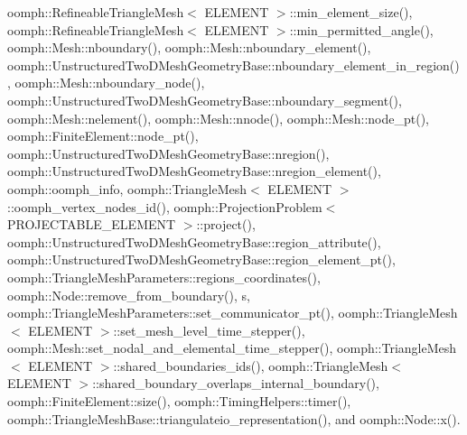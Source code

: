 oomph\+::\+Refineable\+Triangle\+Mesh$<$ E\+L\+E\+M\+E\+N\+T $>$\+::min\+\_\+element\+\_\+size(), oomph\+::\+Refineable\+Triangle\+Mesh$<$ E\+L\+E\+M\+E\+N\+T $>$\+::min\+\_\+permitted\+\_\+angle(), oomph\+::\+Mesh\+::nboundary(), oomph\+::\+Mesh\+::nboundary\+\_\+element(), oomph\+::\+Unstructured\+Two\+D\+Mesh\+Geometry\+Base\+::nboundary\+\_\+element\+\_\+in\+\_\+region(), oomph\+::\+Mesh\+::nboundary\+\_\+node(), oomph\+::\+Unstructured\+Two\+D\+Mesh\+Geometry\+Base\+::nboundary\+\_\+segment(), oomph\+::\+Mesh\+::nelement(), oomph\+::\+Mesh\+::nnode(), oomph\+::\+Mesh\+::node\+\_\+pt(), oomph\+::\+Finite\+Element\+::node\+\_\+pt(), oomph\+::\+Unstructured\+Two\+D\+Mesh\+Geometry\+Base\+::nregion(), oomph\+::\+Unstructured\+Two\+D\+Mesh\+Geometry\+Base\+::nregion\+\_\+element(), oomph\+::oomph\+\_\+info, oomph\+::\+Triangle\+Mesh$<$ E\+L\+E\+M\+E\+N\+T $>$\+::oomph\+\_\+vertex\+\_\+nodes\+\_\+id(), oomph\+::\+Projection\+Problem$<$ P\+R\+O\+J\+E\+C\+T\+A\+B\+L\+E\+\_\+\+E\+L\+E\+M\+E\+N\+T $>$\+::project(), oomph\+::\+Unstructured\+Two\+D\+Mesh\+Geometry\+Base\+::region\+\_\+attribute(), oomph\+::\+Unstructured\+Two\+D\+Mesh\+Geometry\+Base\+::region\+\_\+element\+\_\+pt(), oomph\+::\+Triangle\+Mesh\+Parameters\+::regions\+\_\+coordinates(), oomph\+::\+Node\+::remove\+\_\+from\+\_\+boundary(), s, oomph\+::\+Triangle\+Mesh\+Parameters\+::set\+\_\+communicator\+\_\+pt(), oomph\+::\+Triangle\+Mesh$<$ E\+L\+E\+M\+E\+N\+T $>$\+::set\+\_\+mesh\+\_\+level\+\_\+time\+\_\+stepper(), oomph\+::\+Mesh\+::set\+\_\+nodal\+\_\+and\+\_\+elemental\+\_\+time\+\_\+stepper(), oomph\+::\+Triangle\+Mesh$<$ E\+L\+E\+M\+E\+N\+T $>$\+::shared\+\_\+boundaries\+\_\+ids(), oomph\+::\+Triangle\+Mesh$<$ E\+L\+E\+M\+E\+N\+T $>$\+::shared\+\_\+boundary\+\_\+overlaps\+\_\+internal\+\_\+boundary(), oomph\+::\+Finite\+Element\+::size(), oomph\+::\+Timing\+Helpers\+::timer(), oomph\+::\+Triangle\+Mesh\+Base\+::triangulateio\+\_\+representation(), and oomph\+::\+Node\+::x().

\mbox{\label{classoomph_1_1RefineableTriangleMesh_aaab12a2182859c1a8f4ece3752116944}} 
